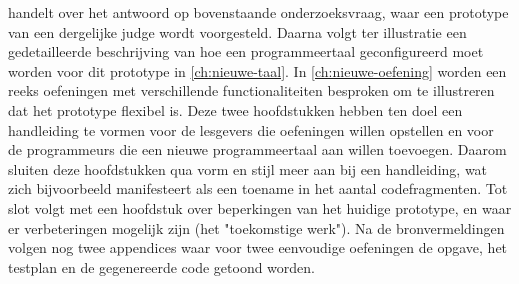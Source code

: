  handelt over het antwoord op bovenstaande onderzoeksvraag, waar een prototype van een dergelijke judge wordt voorgesteld.
Daarna volgt ter illustratie een gedetailleerde beschrijving van hoe een programmeertaal geconfigureerd moet worden voor dit prototype in \cref{ch:nieuwe-taal}.
In \cref{ch:nieuwe-oefening} worden een reeks oefeningen met verschillende functionaliteiten besproken om te illustreren dat het prototype flexibel is.
Deze twee hoofdstukken hebben ten doel een handleiding te vormen voor de lesgevers die oefeningen willen opstellen en voor de programmeurs die een nieuwe programmeertaal aan \tested{} willen toevoegen.
Daarom sluiten deze hoofdstukken qua vorm en stijl meer aan bij een handleiding, wat zich bijvoorbeeld manifesteert als een toename in het aantal codefragmenten.
Tot slot volgt met een hoofdstuk over beperkingen van het huidige prototype, en waar er verbeteringen mogelijk zijn (het "toekomstige werk").
Na de bronvermeldingen volgen nog twee appendices waar voor twee eenvoudige oefeningen de opgave, het testplan en de gegenereerde code getoond worden.